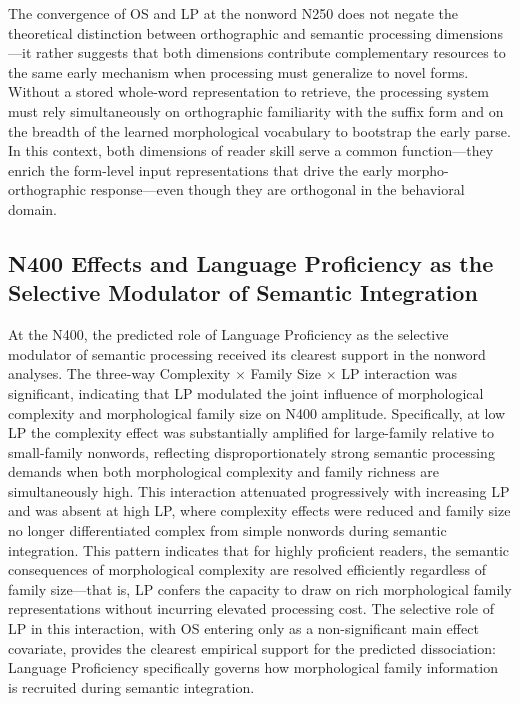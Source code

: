 	The convergence of OS and LP at the nonword N250 does not negate the theoretical distinction between orthographic and semantic processing dimensions—it rather suggests that both dimensions contribute complementary resources to the same early mechanism when processing must generalize to novel forms. Without a stored whole-word representation to retrieve, the processing system must rely simultaneously on orthographic familiarity with the suffix form and on the breadth of the learned morphological vocabulary to bootstrap the early parse. In this context, both dimensions of reader skill serve a common function—they enrich the form-level input representations that drive the early morpho-orthographic response—even though they are orthogonal in the behavioral domain.
	
	\subsection{N400 Effects and Language Proficiency as the Selective Modulator of Semantic Integration}
	
	At the N400, the predicted role of Language Proficiency as the selective modulator of semantic processing received its clearest support in the nonword analyses. The three-way Complexity $\times$ Family Size $\times$ LP interaction was significant, indicating that LP modulated the joint influence of morphological complexity and morphological family size on N400 amplitude. Specifically, at low LP the complexity effect was substantially amplified for large-family relative to small-family nonwords, reflecting disproportionately strong semantic processing demands when both morphological complexity and family richness are simultaneously high. This interaction attenuated progressively with increasing LP and was absent at high LP, where complexity effects were reduced and family size no longer differentiated complex from simple nonwords during semantic integration. This pattern indicates that for highly proficient readers, the semantic consequences of morphological complexity are resolved efficiently regardless of family size—that is, LP confers the capacity to draw on rich morphological family representations without incurring elevated processing cost. The selective role of LP in this interaction, with OS entering only as a non-significant main effect covariate, provides the clearest empirical support for the predicted dissociation: Language Proficiency specifically governs how morphological family information is recruited during semantic integration.
	
